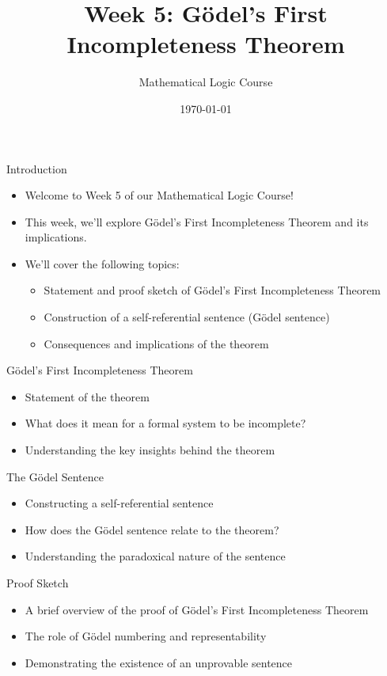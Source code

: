 \documentclass[presentation]{beamer}
\author{Mathematical Logic Course}
\date{\today}
\title{Week 5: Gödel's First Incompleteness Theorem}
\begin{document}
\maketitle

\begin{frame}[label={sec:org996e326}]{Introduction}
\begin{itemize}
\item Welcome to Week 5 of our Mathematical Logic Course!
\item This week, we'll explore Gödel's First Incompleteness Theorem and its implications.
\item We'll cover the following topics:
\begin{itemize}
\item Statement and proof sketch of Gödel's First Incompleteness Theorem
\item Construction of a self-referential sentence (Gödel sentence)
\item Consequences and implications of the theorem
\end{itemize}
\end{itemize}
\end{frame}

\begin{frame}[label={sec:org6a33fc1}]{Gödel's First Incompleteness Theorem}
\begin{itemize}
\item Statement of the theorem
\item What does it mean for a formal system to be incomplete?
\item Understanding the key insights behind the theorem
\end{itemize}
\end{frame}

\begin{frame}[label={sec:org75bda2c}]{The Gödel Sentence}
\begin{itemize}
\item Constructing a self-referential sentence
\item How does the Gödel sentence relate to the theorem?
\item Understanding the paradoxical nature of the sentence
\end{itemize}
\end{frame}

\begin{frame}[label={sec:orgb416e0c}]{Proof Sketch}
\begin{itemize}
\item A brief overview of the proof of Gödel's First Incompleteness Theorem
\item The role of Gödel numbering and representability
\item Demonstrating the existence of an unprovable sentence
\end{itemize}
\end{frame}
\end{document}
